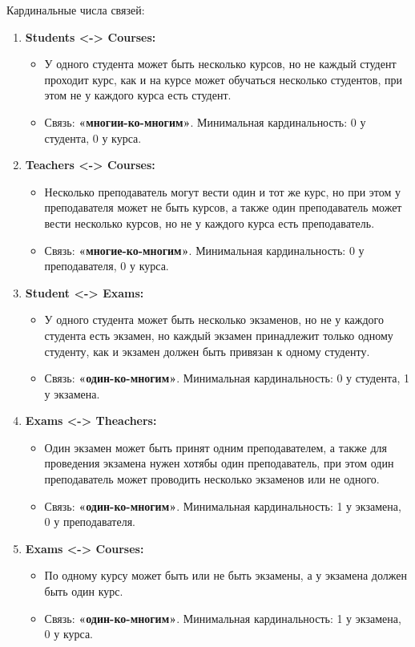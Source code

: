 \documentclass[a4paper, 14pt]{extarticle}
\begin{document}
Кардинальные числа связей:
\begin{enumerate}
    \item \textbf{Students <-> Courses:}
        \begin{itemize}
            \item У одного студента может быть несколько курсов, но не каждый студент проходит курс, как и на курсе может обучаться несколько студентов, при этом не у каждого курса есть студент.
            \item Связь: \textbf{«многии-ко-многим»}. Минимальная кардинальность: 0 у студента, 0 у курса.
        \end{itemize}
    
    \item \textbf{Teachers <-> Courses:}
        \begin{itemize}
            \item Несколько преподаватель могут вести один и тот же курс, но при этом у преподавателя может не быть курсов, а также один преподаватель может вести несколько курсов, но не у каждого курса есть преподаватель.
            \item Связь: \textbf{«многие-ко-многим»}. Минимальная кардинальность: 0 у преподавателя, 0 у курса.
        \end{itemize}

    \item \textbf{Student <-> Exams:}
        \begin{itemize}
            \item У одного студента может быть несколько экзаменов, но не у каждого студента есть экзамен, но каждый экзамен принадлежит только одному студенту, как и экзамен должен быть привязан к одному студенту. 
            \item Связь: \textbf{«один-ко-многим»}. Минимальная кардинальность: 0 у студента, 1 у экзамена.
        \end{itemize}
    
    \item \textbf{Exams <-> Theachers:}
        \begin{itemize}
            \item Один экзамен может быть принят одним преподавателем, а также для проведения экзамена нужен хотябы один преподаватель, при этом один преподаватель может проводить несколько экзаменов или не одного.
            \item Связь: \textbf{«один-ко-многим»}. Минимальная кардинальность: 1 у экзамена, 0 у преподавателя.
        \end{itemize}
    
    \item \textbf{Exams <-> Courses:}
        \begin{itemize}
            \item По одному курсу может быть или не быть экзамены, а у экзамена должен быть один курс.
            \item Связь: \textbf{«один-ко-многим»}. Минимальная кардинальность: 1 у экзамена, 0 у курса.
        \end{itemize}
\end{enumerate}
\end{document}
